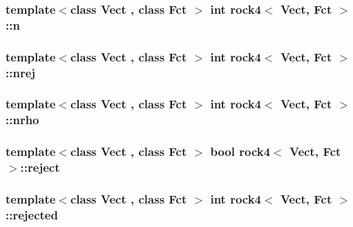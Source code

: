 \hypertarget{classrock4_a2e8c8c2bb59af639b3fd8f36f9cb8862}{
\subsubsection[{n}]{\setlength{\rightskip}{0pt plus 5cm}template$<$class Vect , class Fct $>$ int {\bf rock4}$<$ Vect, Fct $>$\-::n\hspace{0.3cm}{\ttfamily [private]}}}\label{classrock4_a2e8c8c2bb59af639b3fd8f36f9cb8862}
\hypertarget{classrock4_ad9aec741705d486ec533f509030cd1b9}{
\subsubsection[{nrej}]{\setlength{\rightskip}{0pt plus 5cm}template$<$class Vect , class Fct $>$ int {\bf rock4}$<$ Vect, Fct $>$\-::nrej\hspace{0.3cm}{\ttfamily [private]}}}\label{classrock4_ad9aec741705d486ec533f509030cd1b9}
\hypertarget{classrock4_a86a70af8eb60ea3691965dc1b0b86a11}{
\subsubsection[{nrho}]{\setlength{\rightskip}{0pt plus 5cm}template$<$class Vect , class Fct $>$ int {\bf rock4}$<$ Vect, Fct $>$\-::nrho\hspace{0.3cm}{\ttfamily [private]}}}\label{classrock4_a86a70af8eb60ea3691965dc1b0b86a11}
\hypertarget{classrock4_a864fc2c22948d7a534b2b252fe3961f1}{
\subsubsection[{reject}]{\setlength{\rightskip}{0pt plus 5cm}template$<$class Vect , class Fct $>$ bool {\bf rock4}$<$ Vect, Fct $>$\-::reject\hspace{0.3cm}{\ttfamily [private]}}}\label{classrock4_a864fc2c22948d7a534b2b252fe3961f1}
\hypertarget{classrock4_ae609890de1109cba1f25bacc141c8731}{
\subsubsection[{rejected}]{\setlength{\rightskip}{0pt plus 5cm}template$<$class Vect , class Fct $>$ int {\bf rock4}$<$ Vect, Fct $>$\-::rejected\hspace{0.3cm}{\ttfamily [private]}}}\label{classrock4_ae609890de1109cba1f25bacc141c8731}
